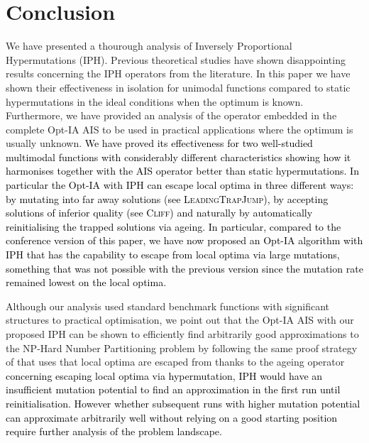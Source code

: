 \documentclass[lettersize,journal]{IEEEtran}
\newcommand{\new}[1]{\textcolor{black}{#1}}
\begin{document}

%



\section{Conclusion}
We have presented a thourough analysis of Inversely Proportional Hypermutations (IPH).
Previous theoretical studies have shown disappointing results concerning the IPH operators from the literature.
In this paper we have 
shown their effectiveness in isolation for unimodal functions compared to static hypermutations in the ideal conditions when the optimum is known.
Furthermore, we have provided an analysis of the operator embedded in the complete Opt-IA AIS to be used in practical applications where the optimum is usually unknown.
\new{We have proved its effectiveness for two well-studied multimodal functions with considerably different characteristics showing how it harmonises together with the AIS operator better than static hypermutations.
In particular the Opt-IA with IPH can escape local optima in three different ways: by mutating into far away solutions (see \textsc{LeadingTrapJump}), by accepting solutions of inferior quality (see \textsc{Cliff}) and naturally by automatically reinitialising the trapped solutions via ageing.
In particular, compared to the conference version of this paper, we have now proposed an Opt-IA algorithm with IPH that has the capability to escape from local optima via large mutations, something that was not possible with the previous version since the mutation rate remained lowest on the local optima.
}

Although our analysis used standard benchmark functions with significant structures to practical optimisation, we point out that the Opt-IA AIS with our proposed IPH can be shown to efficiently find arbitrarily good approximations to the NP-Hard Number Partitioning problem by following the same proof strategy of \cite{CorusOlivetoYazdaniAIJ2019} that uses that local optima are escaped from thanks to the ageing operator \textcolor{black}{concerning escaping local optima via hypermutation, IPH would have an insufficient mutation potential to find an approximation in the first run until reinitialisation. However whether subsequent runs with higher mutation potential can approximate arbitrarily well without relying on a good starting position  require further analysis of the problem landscape.} 
\end{document}
